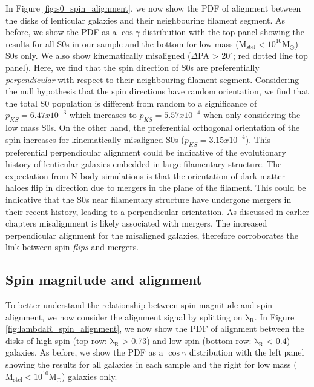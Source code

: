 In Figure \ref{fig:s0_spin_alignment}, we now show the PDF of alignment between the disks of lenticular galaxies and their neighbouring filament segment. As before, we show the PDF as a $\cos \gamma$ distribution with the top panel showing the results for all S0s in our sample and the bottom for low mass ($\mathrm{M_{stel} < 10^{10} M_{\odot}}$) S0s only. We also show kinematically misaligned ($\Delta$PA > 20$^{\circ}$; red dotted line top panel). Here, we find that the spin direction of S0s are preferentially \textit{perpendicular} with respect to their neighbouring filament segment. Considering the null hypothesis that the spin directions have random orientation, we find that the total S0 population is different from random to a significance of $p_{KS} = 6.47 x 10^{-3}$ which increases to  $p_{KS} = 5.57 x 10^{-4}$ when only considering the low mass S0s. On the other hand, the preferential orthogonal orientation of the spin increases for kinematically misaligned S0s ($p_{KS} = 3.15 x 10^{-4}$). This preferential perpendicular alignment could be indicative of the evolutionary history of lenticular galaxies embedded in large filamentary structure. The expectation from N-body simulations is that the orientation of dark matter haloes flip in direction due to mergers in the plane of the filament. This could be indicative that the S0s near filamentary structure have undergone mergers in their recent history, leading to a perpendicular orientation. As discussed in earlier chapters \citep[see also;][]{barrera2015, li_decoupling2019} misalignment is likely associated with mergers. The increased perpendicular alignment for the misaligned galaxies, therefore corroborates the link between spin \textit{flips} and mergers.

\subsection{Spin magnitude and alignment}
To better understand the relationship between spin magnitude and spin alignment, we now consider the alignment signal by splitting on $\mathrm{\lambda_R}$. In Figure \ref{fig:lambdaR_spin_alignment}, we now show the PDF of alignment between the disks of high spin (top row: $\mathrm{\lambda_{R}}$ > 0.73) and low spin (bottom row: $\mathrm{\lambda_{R}}$ < 0.4) galaxies. As before, we show the PDF as a $\cos \gamma$ distribution with the left panel showing the results for all galaxies in each sample and the right for low mass ($\mathrm{M_{stel} < 10^{10} M_{\odot}}$) galaxies only. 

